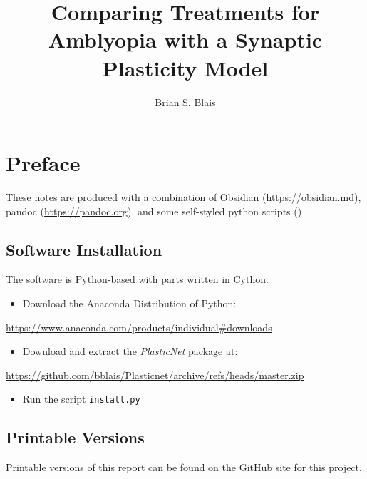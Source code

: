 \documentclass[
  onecolumn]{article}
\title{Comparing Treatments for Amblyopia with a Synaptic Plasticity
Model}
\author{Brian S. Blais}
\date{}
\providecommand{\tightlist}{%
  \setlength{\itemsep}{0pt}\setlength{\parskip}{0pt}}
\begin{document}
\maketitle

{
\hypersetup{linkcolor=}
\setcounter{tocdepth}{3}
\tableofcontents
}
\hypertarget{preface}{%
\section*{Preface}\label{preface}}

These notes are produced with a combination of Obsidian
(\url{https://obsidian.md}), pandoc (\url{https://pandoc.org}), and some
self-styled python scripts ()

\hypertarget{software-installation}{%
\subsection*{Software Installation}\label{software-installation}}

The software is Python-based with parts written in Cython.

\begin{itemize}
\tightlist
\item
  Download the Anaconda Distribution of Python:
\end{itemize}

\url{https://www.anaconda.com/products/individual\#downloads}

\begin{itemize}
\tightlist
\item
  Download and extract the \emph{PlasticNet} package at:
\end{itemize}

\url{https://github.com/bblais/Plasticnet/archive/refs/heads/master.zip}

\begin{itemize}
\tightlist
\item
  Run the script \texttt{install.py}
\end{itemize}

\hypertarget{printable-versions}{%
\subsection*{Printable Versions}\label{printable-versions}}

Printable versions of this report can be found on the GitHub site for
this project,
\end{document}
